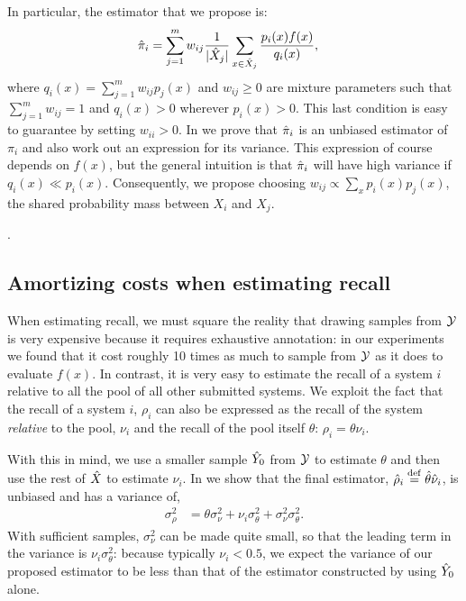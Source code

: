 In particular, the estimator that we propose is:
\begin{align*}
  {\hat{\pi}}_i &= \sum_{j=1}^m w_{ij} \frac{1}{|{\hat{X}}_j|} \sum_{x \in {\hat{X}}_j} \frac{p_i(x) f(x)}{q_i(x)},
\end{align*}
where $q_i(x) = \sum_{j=1}^m w_{ij} p_j(x)$ and $w_{ij} \ge 0$ are mixture parameters such that $\sum_{j=1}^m w_{ij} = 1$ and $q_i(x) > 0$ wherever $p_i(x) > 0$.
This last condition is easy to guarantee by setting $w_{ii} > 0$.
In  we prove that ${\hat{\pi}}_i$ is an unbiased estimator of $\pi_i$ and also work out an expression for its variance. 
This expression of course depends on $f(x)$, but the general intuition is that 
${\hat{\pi}}_i$ will have high variance if $q_i(x) \ll p_i(x)$.
Consequently, we propose choosing $w_{ij} \propto \sum_{x} p_i(x) p_j(x)$, the shared probability mass between $X_i$ and $X_j$.

.

\subsection{Amortizing costs when estimating recall}
When estimating recall, we must square the reality that drawing samples from $\mathcal{Y}$ is very expensive because it requires exhaustive annotation: in our experiments we found that it cost roughly 10 times as much to sample from $\mathcal{Y}$ as it does to evaluate $f(x)$.
In contrast, it is very easy to estimate the recall of a system $i$ relative to all the pool of all other submitted systems.
We exploit the fact that the recall of a system $i$, $\rho_i$ can also be expressed as the recall of the system \textit{relative} to the pool, $\nu_i$ and the recall of the pool itself $\theta$: $\rho_i = \theta \nu_i$.

With this in mind, we use a smaller sample ${\hat{Y}}_0$ from $\mathcal{Y}$ to estimate $\theta$ and then use the rest of ${\hat{X}}$ to estimate $\nu_i$.
In  we show that the final estimator, ${\hat{\rho}}_i \stackrel{\rm def}{=} {\hat{\theta}} {\hat{\nu}}_i$, is unbiased and has a variance of,
\begin{align*}
  \sigma^2_\rho &= \theta \sigma^2_\nu + \nu_i \sigma^2_\theta + \sigma^2_\nu \sigma^2_\theta.
\end{align*}
With sufficient samples, $\sigma^2_\nu$ can be made quite small, so that the leading term in the variance is $\nu_i \sigma^2_\theta$: because typically $\nu_i < 0.5$, we expect the variance of our proposed estimator to be less than that of the estimator constructed by using ${\hat{Y}}_0$ alone.

